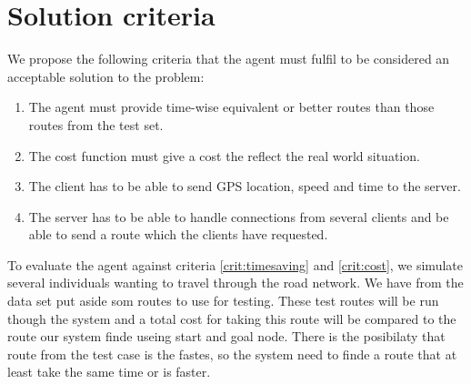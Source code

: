 \section{Solution criteria}\label{chap:solutioncriteria}
We propose the following criteria that the agent must fulfil to be considered an acceptable solution to the problem:

\begin{enumerate}
\item The agent must provide time-wise equivalent or better routes than those routes from the test set.\label{crit:timesaving}
\item The cost function must give a cost the reflect the real world situation.\label{crit:cost}
\item The client has to be able to send GPS location, speed and time to the server.\label{crit:sendmessages}
\item The server has to be able to handle connections from several clients and be able to send a route which the clients have requested.\label{crit:severalconnections}
\end{enumerate}

To evaluate the agent against criteria \ref{crit:timesaving} and \ref{crit:cost}, we simulate several individuals wanting to travel through the road network. We have from the data set put aside som routes to use for testing. These test routes will be run though the system and a total cost for taking this route will be compared to the route our system finde useing start and goal node. There is the posibilaty that route from the test case is the fastes, so the system need to finde a route that at least take the same time or is faster.


